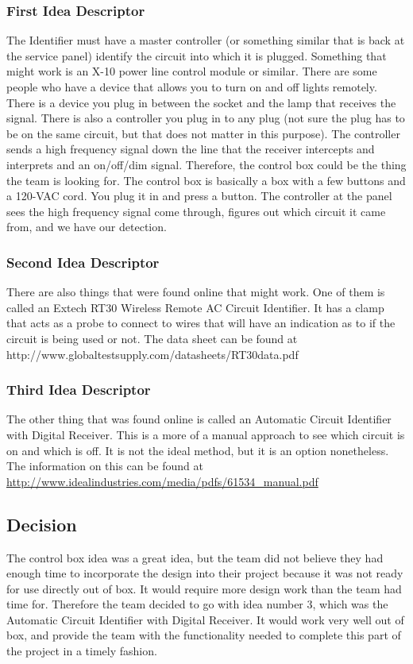 \subsubsection{First Idea Descriptor}
The Identifier must have a master controller (or something similar that is back at the service panel) identify the circuit into which it is plugged. Something that might work is an X-10 power line control module or similar. There are some people who have a device that allows you to turn on and off lights remotely. There is a device you plug in between the socket and the lamp that receives the signal. There is also a controller you plug in to any plug (not sure the plug has to be on the same circuit, but that does not matter in this purpose). The controller sends a high  frequency signal down the line that the receiver intercepts and interprets and an on/off/dim signal. Therefore, the control box could be the thing the team is looking for. The control box is basically a box with a few buttons and a 120-VAC cord. You plug it in and press a button. The controller at the panel sees the high  frequency signal come through, figures out which circuit it came from, and we have our detection. 

\subsubsection{Second Idea Descriptor}
There are also things that were found online that might work. One of them is called an Extech RT30 Wireless Remote AC Circuit Identifier. It has a clamp that acts as a probe to connect to wires that will have an indication as to if the circuit is being used or not. The data sheet can be found at http://www.globaltestsupply.com/datasheets/RT30data.pdf

\subsubsection{Third Idea Descriptor}
The other thing that was found online is called an Automatic Circuit Identifier with Digital Receiver. This is a more of a manual approach to see which circuit is on and which is off. It is not the ideal method, but it is an option nonetheless. The information on this can be found at \url{http://www.idealindustries.com/media/pdfs/61534_manual.pdf}
\subsection{Decision}
The control box idea was a great idea, but the team did not believe they had enough time to incorporate the design into their project because it was not ready for use directly out of box. It would require more design work than the team had time for. Therefore the team decided to go with idea number 3, which was the Automatic Circuit Identifier with Digital Receiver. It would work very well out of box, and provide the team with the functionality needed to complete this part of the project in a timely fashion. 